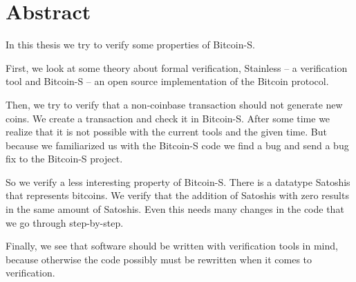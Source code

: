 \chapter*{Abstract}
\label{chap:abstract}

In this thesis we try to verify some properties of Bitcoin-S.

First, we look at some theory about formal verification, Stainless -- a verification tool and Bitcoin-S -- an open source implementation of the Bitcoin protocol.

Then, we try to verify that a non-coinbase transaction should not generate new coins.
We create a transaction and check it in Bitcoin-S.
After some time we realize that it is not possible with the current tools and the given time.
But because we familiarized us with the Bitcoin-S code we find a bug and send a bug fix to the Bitcoin-S project.

So we verify a less interesting property of Bitcoin-S.
There is a datatype Satoshis that represents bitcoins. We verify that the addition of Satoshis with zero results in the same amount of Satoshis.
Even this needs many changes in the code that we go through step-by-step.

Finally, we see that software should be written with verification tools in mind, because otherwise the code possibly must be rewritten when it comes to verification.

